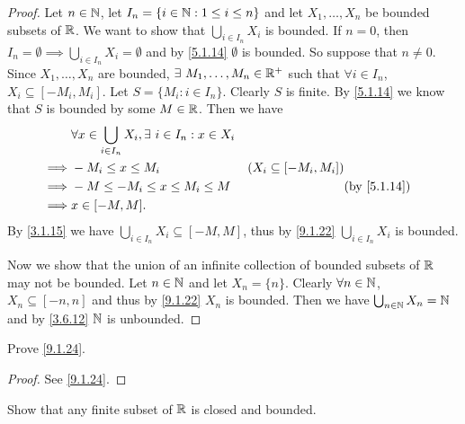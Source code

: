 \begin{proof}
  Let \(n \in \mathbb{N}\), let \(I_n = \{i \in \mathbb{N} : 1 \leq i \leq n\}\) and let \(X_1, \dots, X_n\) be bounded subsets of \(\mathbb{R}\).
  We want to show that \(\bigcup_{i \in I_n} X_i\) is bounded.
  If \(n = 0\), then \(I_n = \emptyset \implies \bigcup_{i \in I_n} X_i = \emptyset\) and by \cref{5.1.14} \(\emptyset\) is bounded.
  So suppose that \(n \neq 0\).
  Since \(X_1, \dots, X_n\) are bounded, \(\exists\ M_1, \dots, M_n \in \mathbb{R}^+\) such that \(\forall i \in I_n\), \(X_i \subseteq [-M_i, M_i]\).
  Let \(S = \{M_i : i \in I_n\}\).
  Clearly \(S\) is finite.
  By \cref{5.1.14} we know that \(S\) is bounded by some \(M \in \mathbb{R}\).
  Then we have
  \begin{align*}
             & \forall x \in \bigcup_{i \in I_n} X_i, \exists\ i \in I_n : x \in X_i                                                           \\
    \implies & -M_i \leq x \leq M_i                                                  & (X_i \subseteq [-M_i, M_i])                             \\
    \implies & -M \leq -M_i \leq x \leq M_i \leq M                                   &                             & \text{(by \cref{5.1.14})} \\
    \implies & x \in [-M, M].
  \end{align*}
  By \cref{3.1.15} we have \(\bigcup_{i \in I_n} X_i \subseteq [-M, M]\), thus by \cref{9.1.22} \(\bigcup_{i \in I_n} X_i\) is bounded.

  Now we show that the union of an infinite collection of bounded subsets of \(\mathbb{R}\) may not be bounded.
  Let \(n \in \mathbb{N}\) and let \(X_n = \{n\}\).
  Clearly \(\forall n \in \mathbb{N}\), \(X_n \subseteq [-n, n]\) and thus by \cref{9.1.22} \(X_n\) is bounded.
  Then we have \(\bigcup_{n \in \mathbb{N}} X_n = \mathbb{N}\) and by \cref{3.6.12} \(\mathbb{N}\) is unbounded.
\end{proof}

\begin{ex}\label{ex:9.1.13}
  Prove \cref{9.1.24}.
\end{ex}

\begin{proof}
  See \cref{9.1.24}.
\end{proof}

\begin{ex}\label{ex:9.1.14}
  Show that any finite subset of \(\mathbb{R}\) is closed and bounded.
\end{ex}

